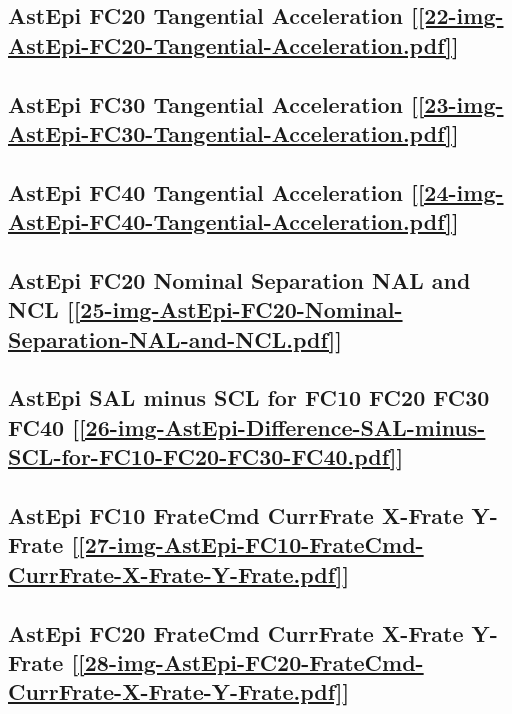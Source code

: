 \subsection       {AstEpi FC20 Tangential Acceleration
	[\ref      {22-img-AstEpi-FC20-Tangential-Acceleration.pdf}] }
\label{ssec-22-img-AstEpi-FC20-Tangential-Acceleration.pdf}

\subsection       {AstEpi FC30 Tangential Acceleration
	[\ref      {23-img-AstEpi-FC30-Tangential-Acceleration.pdf}] }
\label{ssec-23-img-AstEpi-FC30-Tangential-Acceleration.pdf}

\subsection       {AstEpi FC40 Tangential Acceleration
	[\ref      {24-img-AstEpi-FC40-Tangential-Acceleration.pdf}] }
\label{ssec-24-img-AstEpi-FC40-Tangential-Acceleration.pdf}

\subsection       {AstEpi FC20 Nominal Separation NAL and NCL
	[\ref      {25-img-AstEpi-FC20-Nominal-Separation-NAL-and-NCL.pdf}] }
\label{ssec-25-img-AstEpi-FC20-Nominal-Separation-NAL-and-NCL.pdf}

\subsection       {AstEpi SAL minus SCL for FC10 FC20 FC30 FC40
	[\ref      {26-img-AstEpi-Difference-SAL-minus-SCL-for-FC10-FC20-FC30-FC40.pdf}] }
\label{ssec-26-img-AstEpi-Difference-SAL-minus-SCL-for-FC10-FC20-FC30-FC40.pdf}


\subsection       {AstEpi FC10 FrateCmd CurrFrate X-Frate Y-Frate
	[\ref      {27-img-AstEpi-FC10-FrateCmd-CurrFrate-X-Frate-Y-Frate.pdf}] }
\label{ssec-27-img-AstEpi-FC10-FrateCmd-CurrFrate-X-Frate-Y-Frate.pdf}

\subsection       {AstEpi FC20 FrateCmd CurrFrate X-Frate Y-Frate
	[\ref      {28-img-AstEpi-FC20-FrateCmd-CurrFrate-X-Frate-Y-Frate.pdf}] }
\label{ssec-28-img-AstEpi-FC20-FrateCmd-CurrFrate-X-Frate-Y-Frate.pdf}

